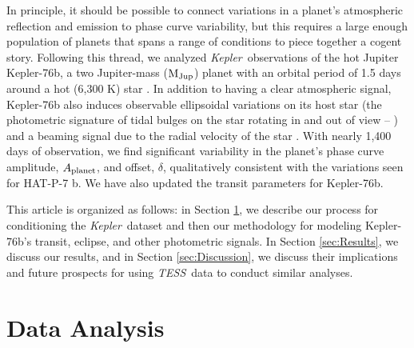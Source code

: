 \documentclass[manuscript]{aastex62}
\newcommand{\kepler}{{\it Kepler}}
\newcommand{\tess}{{\it TESS}}
\begin{document}
In principle, it should be possible to connect variations in a planet's atmospheric reflection and emission to phase curve variability, but this requires a large enough population of planets that spans a range of conditions to piece together a cogent story. Following this thread, we analyzed \kepler\ observations of the hot Jupiter Kepler-76b, a two Jupiter-mass (${\rm M_{Jup}}$) planet with an orbital period of 1.5 days around a hot (6,300 K) star \citep{2013ApJ...771...26F}. In addition to having a clear atmospheric signal, Kepler-76b also induces observable ellipsoidal variations on its host star (the photometric signature of tidal bulges on the star rotating in and out of view -- \citealp{2010ApJ...713L.145W}) and a beaming signal due to the radial velocity of the star \citep{2003ApJ...588L.117L}. With nearly 1,400 days of observation, we find significant variability in the planet's phase curve amplitude, $A_{\rm planet}$, and offset, $\delta$, qualitatively consistent with the variations seen for HAT-P-7 b. We have also updated the transit parameters for Kepler-76b.

This article is organized as follows: in Section \ref{sec:Data_Analysis}, we describe our process for conditioning the \kepler\ dataset and then our methodology for modeling Kepler-76b's transit, eclipse, and other photometric signals. In Section \ref{sec:Results}, we discuss our results, and in Section \ref{sec:Discussion}, we discuss their implications and future prospects for using \tess\ data to conduct similar analyses.

\section{Data Analysis}
\label{sec:Data_Analysis}
\end{document}
